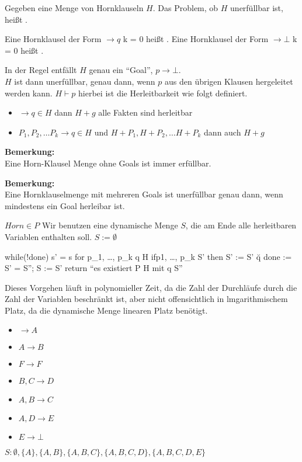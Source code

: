 \begin{definition}
    Gegeben eine Menge von Hornklauseln $H$.
    Das Problem, ob $H$ unerfüllbar ist, heißt .
\end{definition}

\begin{definition}
    Eine Hornklausel der Form $\rightarrow q$ k = 0 heißt .
    Eine Hornklausel der Form $\rightarrow \bot$ k = 0 heißt .
\end{definition}

In der Regel entfällt $H$ genau ein ``Goal'', $p\rightarrow \bot$.
\\
$H$ ist dann unerfüllbar, genau dann, wenn $p$ aus den übrigen Klausen hergeleitet werden kann. $H \vdash p$ hierbei ist die Herleitbarkeit wie folgt definiert.
\begin{itemize}
\item $\rightarrow q \in H$ dann $H+g$ alle Fakten sind herleitbar
\item $P_1, P_2, \dots P_k \rightarrow q \in H$ und
$H+P_1, H+P_2, \dots H+P_k$ dann auch $H+g$
\end{itemize}

\textbf{Bemerkung:}\\
Eine Horn-Klausel Menge ohne Goals ist immer erfüllbar.

\textbf{Bemerkung:}\\
Eine Hornklauselmenge mit mehreren Goals ist unerfüllbar
genau dann, wenn mindestens ein Goal herleibar ist.

\begin{satz}
$Horn \in P$ Wir benutzen eine dynamische Menge $S$, die am Ende alle
herleitbaren Variablen enthalten soll. $S:=\emptyset$
\end{satz}

\begin{codebox}[javascript]
while(!done)
  s' =  s
  for p_1, \dots, p_k  \rightarrow q \in H
    if{p1, \dots, p_k} \seteq S' then
      S' := S' \u {q}
    done := S' = S''; S := S'
return ``es existiert P \rightarrow \bot \in H mit q \subseteq S''
\end{codebox}

Dieses Vorgehen läuft in polynomieller Zeit, da die Zahl der
Durchläufe durch die Zahl der Variablen beschränkt ist, aber nicht
offensichtlich in lmgarithmischem Platz, da die dynamische Menge linearen Platz
benötigt.

\begin{beispiel}
    \begin{itemize}
    \item $ \rightarrow A $
    \item $ A \rightarrow B $
    \item $ F\rightarrow F $
    \item $ B,C \rightarrow D $
    \item $ A,B \rightarrow C $
    \item $ A,D \rightarrow E $
    \item $ E\rightarrow \bot $
    \end{itemize}
    $S:\emptyset ,\{A\},\{A,B\},\{A,B,C\},\{A,B,C,D\},\{A,B,C,D,E\}$
\end{beispiel}

